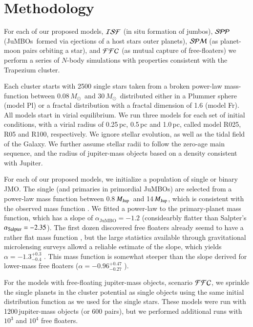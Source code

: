 \documentclass[aa]{lib/aa}
\newcommand{\MSun}{\mbox{${M}_\odot$}}
\newcommand{\MJup}{\mbox{${M}_{\rm Jup}$}}
\newcommand{\jumbo}{\mbox{JuMBO}}
\newcommand{\jumbos}{\mbox{JuMBOs}}
\begin{document}
\section{Methodology}

For each of our proposed models, ${\cal ISF}$ (in situ formation of
jumbos), ${\cal SPP}$ (\jumbos\, formed via ejections of a host stars
outer planets), ${\cal SPM}$ (as planet-moon pairs orbiting a star),
and ${\cal FFC}$ (as mutual capture of free-floaters) we perform a
series of $N$-body simulations with properties consistent with the
Trapezium cluster.

Each cluster starts with 2500 single stars taken from a broken
power-law mass-function \citep{2002Sci...295...82K} between
0.08\,\MSun\, and $30$\,\MSun\, distributed either in a Plummer sphere
(model Pl) or a fractal distribution with a fractal dimension of 1.6
(model Fr). All models start in virial equilibrium.  We run three
models for each set of initial conditions, with a virial radius of
0.25\,pc, 0.5\,pc and 1.0\,pc, called model R025, R05 and R100,
respectively.  We ignore stellar evolution, as well as the tidal field
of the Galaxy. We further assume stellar radii to follow the zero-age
main sequence, and the radius of jupiter-mass objects based on a
density consistent with Jupiter.

For each of our proposed models, we initialize a population of single
or binary JMO. The single (and primaries in primordial \jumbos) are
selected from a power-law mass function between 0.8\,\MJup\, and
14\,\MJup, which is consistent with the observed mass function
\citep{2023arXiv231001231P}. We fitted a power-law to the
primary-planet mass function, which has a slope of $\alpha_{\jumbo}
=-1.2$ (considearbly flatter than Salpter's $\alpha_{\rm Salpter} =
-2.35$).  The first dozen discovered free floaters already seemd to
have a rather flat mass function \citep{2000MNRAS.314..858L}, but the
large statistics available through gravitational microlensing surveys
allowd a reliable estimate of the slope, which yields $\alpha =
-1.3^{+0.3}_{-0.4}$ \citep{2011Natur.473..349S}. This mass function is
somewhat steeper than the slope derived for lower-mass free floaters
($\alpha = -0.96^{+0.47}_{-0.27}$ \citep{2023AJ....166..108S}).

For the models with free-floating jupiter-mass objects, scenario
${\cal FFC}$, we sprinkle the single planets in the cluster potential
as single objects using the same initial distribution function as we
used for the single stars.  These models were run with
1200\,jupiter-mass objects (or 600 pairs), but we performed additional
runs with $10^3$ and $10^4$ free floaters.
\end{document}
